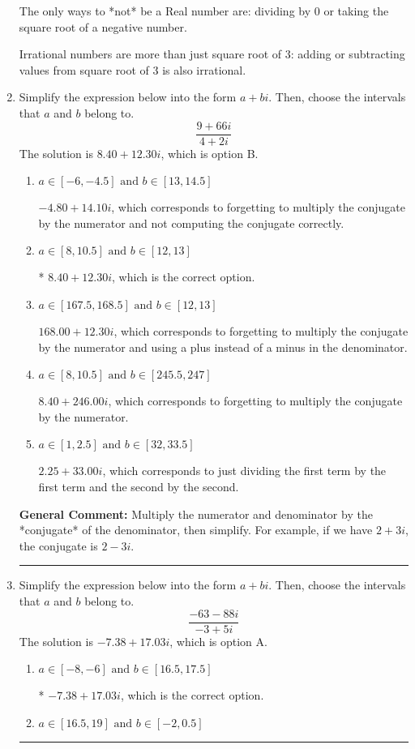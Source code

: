 \documentclass{extbook}[14pt]
\newcommand{\litem}[1]{\item #1

\rule{\textwidth}{0.4pt}}
\begin{document}
\begin{enumerate}
{ The only ways to *not* be a Real number are: dividing by 0 or taking the square root of a negative number. 
 
 Irrational numbers are more than just square root of 3: adding or subtracting values from square root of 3 is also irrational.
}
\litem{
Simplify the expression below into the form $a+bi$. Then, choose the intervals that $a$ and $b$ belong to.
\[ \frac{9 + 66 i}{4 + 2 i} \]
The solution is \( 8.40  + 12.30 i \), which is option B.\begin{enumerate}[label=\Alph*.]
\item \( a \in [-6, -4.5] \text{ and } b \in [13, 14.5] \)

 $-4.80  + 14.10 i$, which corresponds to forgetting to multiply the conjugate by the numerator and not computing the conjugate correctly.
\item \( a \in [8, 10.5] \text{ and } b \in [12, 13] \)

* $8.40  + 12.30 i$, which is the correct option.
\item \( a \in [167.5, 168.5] \text{ and } b \in [12, 13] \)

 $168.00  + 12.30 i$, which corresponds to forgetting to multiply the conjugate by the numerator and using a plus instead of a minus in the denominator.
\item \( a \in [8, 10.5] \text{ and } b \in [245.5, 247] \)

 $8.40  + 246.00 i$, which corresponds to forgetting to multiply the conjugate by the numerator.
\item \( a \in [1, 2.5] \text{ and } b \in [32, 33.5] \)

 $2.25  + 33.00 i$, which corresponds to just dividing the first term by the first term and the second by the second.
\end{enumerate}

\textbf{General Comment:} Multiply the numerator and denominator by the *conjugate* of the denominator, then simplify. For example, if we have $2+3i$, the conjugate is $2-3i$.
}
\litem{
Simplify the expression below into the form $a+bi$. Then, choose the intervals that $a$ and $b$ belong to.
\[ \frac{-63 - 88 i}{-3 + 5 i} \]
The solution is \( -7.38  + 17.03 i \), which is option A.\begin{enumerate}[label=\Alph*.]
\item \( a \in [-8, -6] \text{ and } b \in [16.5, 17.5] \)

* $-7.38  + 17.03 i$, which is the correct option.
\item \( a \in [16.5, 19] \text{ and } b \in [-2, 0.5] \)


\end{enumerate}}
\end{enumerate}
\end{document}
